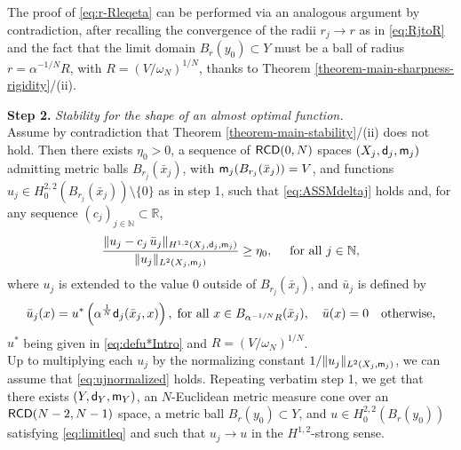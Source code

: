 \documentclass[11pt, reqno]{amsart}
\numberwithin{equation}{section}
\begin{document}
  The proof of \eqref{eq:r-Rleqeta} can be performed via an analogous argument by contradiction, after recalling the convergence of the radii $r_j\to r$ as in \eqref{eq:RjtoR} and the fact that the limit domain $B_{r}(y_{0})\subset Y$ must be a ball of radius $r=\alpha^{-1/N}R$, with  $R=(V/\omega_N)^{1/N}$, thanks to Theorem \ref{theorem-main-sharpness-rigidity}/(ii).
\smallskip
 
 
 \textbf{Step 2.} \textit{Stability for the shape of an almost optimal function.}
 \\ Assume by contradiction that Theorem \ref{theorem-main-stability}/(ii) does not hold. Then there exists $\eta_{0}>0$,  a sequence of ${\sf RCD}(0,N)$ spaces $(X_j, {\sf d}_j, {\sf m}_j)$ admitting metric balls $B_{r_{j}}(\bar x_{j})$, with ${\sf m}_j (B_{r_j}(\bar x_j))=V$,  and functions $u_{j} \in H^{2,2}_{0} (B_{r_j}(\bar x_{j}))\setminus \{0\}$ as in step 1,  such that \eqref{eq:ASSMdeltaj} holds and, for any  sequence $(c_j)_{j\in \mathbb{N}} \subset \mathbb{R}$, 
  \begin{equation}\label{eq:Thesiseta0function}
		 \frac{\|u_j- c_j \, \bar u_j\|_{H^{1,2}(X_j, {\sf d}_j, {\sf m}_j)}} {\|u_j\|_{L^2(X_j,  {\sf m}_j)}}\geq \eta_{0}, \quad \text{ for all } j\in \mathbb{N}, 
		\end{equation}
  where $u_j$ is extended to the value $0$ outside of $B_{r_j}(\bar x_{j})$, and $\bar u_j$ is defined by 
  \begin{equation*}
\bar u_j(x)=u^*\left(\alpha^{\frac{1}{N}}{\sf d}_j(\bar x_j,x)\right),\; \text{for all }x\in B_{\alpha^{-{1}/{N}}R}(\bar x_j), \quad \bar u(x)=0 \quad  \text{otherwise},
 \end{equation*}
 $u^*$ being given in \eqref{eq:defu*Intro} and  $R= (V / \omega_N)^{1/N}$. 
 \\ Up to multiplying each $u_j$ by the normalizing constant $1/\|u_j\|_{L^2(X_j, {\sf m}_j)}$, we can assume that \eqref{eq:ujnormalized} holds. Repeating verbatim step 1, we get that there exists $(Y, {\sf d}_{Y}, {\sf m}_{Y})$,  an $N$-Euclidean metric measure cone over an ${\sf RCD}(N-2,N-1)$ space, a metric ball $B_r(y_0)\subset Y$, and $u\in H^{2,2}_0(B_r(y_0))$  satisfying \eqref{eq:limitleq} and such that $u_j\to u$ in the $H^{1,2}$-strong sense.
\end{document}
